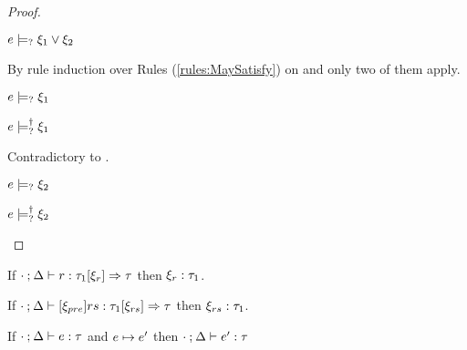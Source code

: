 \begin{proof}
\begin{byCases}
  \item[\text{(\ref{rule:CMSPossibly})}]
    \begin{pfsteps*}
    \item $e \models_{?} \xi_1 \vee \xi_2$  
    \end{pfsteps*}
    By rule induction over Rules (\ref{rules:MaySatisfy}) on  and only two of them apply.
    \begin{byCases}
    \item[\text{(\ref{rule:CPSOr1})}]
      \begin{pfsteps*}
      \item $e \models_{?} \xi_1$  
      \item $e \models_{?}^{\dag} \xi_1$ 
      \end{pfsteps*}
      Contradictory to .
    \item[\text{(\ref{rule:CPSOr2})}]
      \begin{pfsteps*}
      \item $e \models_{?} \xi_2$  
      \item $e \models_{?}^{\dag} \xi_2$ 
      \end{pfsteps*}
    \end{byCases}
  \end{byCases}
\end{proof}

\begin{lem}
  \label{lem:rule-constraint-typ}
  If $\cdot \mathbin{;} \Delta \vdash r : \tau_1 [\xi_r] \Rightarrow \tau$ then $\xi_r : \tau_1$.
\end{lem}

\begin{lem}
  \label{lem:rules-constraint-typ}
  If $\cdot \mathbin{;} \Delta \vdash [\xi_{pre}] rs : \tau_1 [\xi_{rs}] \Rightarrow \tau$ then $\xi_{rs} : \tau_1$.
\end{lem}

\begin{thm}[Preservation]
  \label{thrm:preservation}
  If $\cdot \mathbin{;} \Delta \vdash e : \tau$ and $e \mapsto e'$
  then $\cdot \mathbin{;} \Delta \vdash e' : \tau$
\end{thm}

